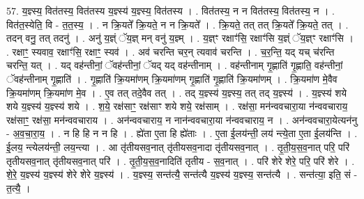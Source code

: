 \documentclass[17pt]{extarticle}
\begin{document}
57. य॒ज्ञ्स्य॒ वित॑तस्य॒ वित॑तस्य य॒ज्ञ्स्य॑ य॒ज्ञ्स्य॒ वित॑तस्य । . वित॑तस्य॒ न न वित॑तस्य॒ वित॑तस्य॒ न । . वित॑त॒स्येति॒ वि - त॒त॒स्य॒ । . न क्रि॒यते᳚ क्रि॒यते॒ न न क्रि॒यते᳚ । . क्रि॒यते॒ तत् तत् क्रि॒यते᳚ क्रि॒यते॒ तत् । . तदन् वनु॒ तत् तदनु॑ । . अनु॑ य॒ज्ञ्ं ॅय॒ज्ञ् मन् वनु॑ य॒ज्ञ्म् । . य॒ज्ञ्ꣳ रक्षाꣳ॑सि॒ रक्षाꣳ॑सि य॒ज्ञ्ं ॅय॒ज्ञ्ꣳ रक्षाꣳ॑सि । . रक्षाꣳ॒॒ स्यवाव॒ रक्षाꣳ॑सि॒ रक्षाꣳ॒॒ स्यव॑ । . अव॑ चरन्ति चर॒न् त्यवाव॑ चरन्ति । . च॒र॒न्ति॒ यद् यच् च॑रन्ति चरन्ति॒ यत् । . यद् वह॑न्तीनां॒ ॅवह॑न्तीनां॒ ॅयद् यद् वह॑न्तीनाम् । . वह॑न्तीनाम् गृ॒ह्णाति॑ गृ॒ह्णाति॒ वह॑न्तीनां॒ ॅवह॑न्तीनाम् गृ॒ह्णाति॑ । . गृ॒ह्णाति॑ क्रि॒यमा॑णम् क्रि॒यमा॑णम् गृ॒ह्णाति॑ गृ॒ह्णाति॑ क्रि॒यमा॑णम् । . क्रि॒यमा॑ण मे॒वैव क्रि॒यमा॑णम् क्रि॒यमा॑ण मे॒व । . ए॒व तत् तदे॒वैव तत् । . तद् य॒ज्ञ्स्य॑ य॒ज्ञ्स्य॒ तत् तद् य॒ज्ञ्स्य॑ । . य॒ज्ञ्स्य॑ शये शये य॒ज्ञ्स्य॑ य॒ज्ञ्स्य॑ शये । . श॒ये॒ रक्ष॑साꣳ॒॒ रक्ष॑साꣳ शये शये॒ रक्ष॑साम् । . रक्ष॑सा॒ मन॑न्ववचारा॒या न॑न्ववचाराय॒ रक्ष॑साꣳ॒॒ रक्ष॑सा॒ मन॑न्ववचाराय । . अन॑न्ववचाराय॒ न नान॑न्ववचारा॒या न॑न्ववचाराय॒ न । . अन॑न्ववचारा॒येत्यन॑नु - अ॒व॒चा॒रा॒य॒ । . न हि हि न न हि । . ह्ये॑ता ए॒ता हि ह्ये॑ताः । . ए॒ता ई॒लय॑न्ती॒ लय॑ न्त्ये॒ता ए॒ता ई॒लय॑न्ति । . ई॒लय॒ न्त्येलय॑न्ती॒ लय॒न्त्या । . आ तृ॑तीयसव॒नात् तृ॑तीयसव॒नादा तृ॑तीयसव॒नात् । . तृ॒ती॒य॒स॒व॒नात् परि॒ परि॑ तृतीयसव॒नात् तृ॑तीयसव॒नात् परि॑ । . तृ॒ती॒य॒स॒व॒नादिति॑ तृतीय - स॒व॒नात् । . परि॑ शेरे शेरे॒ परि॒ परि॑ शेरे । . शे॒रे॒ य॒ज्ञ्स्य॑ य॒ज्ञ्स्य॑ शेरे शेरे य॒ज्ञ्स्य॑ । . य॒ज्ञ्स्य॒ सन्त॑त्यै॒ सन्त॑त्यै य॒ज्ञ्स्य॑ य॒ज्ञ्स्य॒ सन्त॑त्यै । . सन्त॑त्या॒ इति॒ सं - त॒त्यै॒ । \newline
\end{document}
